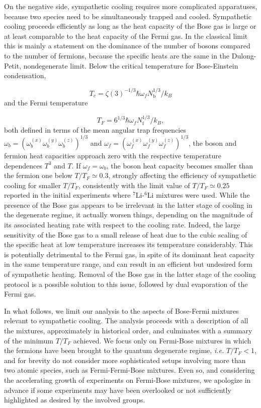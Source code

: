 \documentclass[pra,letterpaper,twocolumn,showpacs,superscriptaddress]{revtex4}
\begin{document}
On the negative side, sympathetic cooling requires more complicated apparatuses, because two species need to be simultaneously trapped and cooled. 
Sympathetic cooling proceeds efficiently as long as the heat capacity of the Bose gas is large or at least comparable to the heat capacity of the Fermi gas. 
In the classical limit this is mainly a statement on the dominance of the number of bosons compared to the number of fermions, because the specific heats 
are the same in the Dulong-Petit, nondegenerate limit. Below the critical temperature for Bose-Einstein condensation, 

$$T_c=\zeta(3)^{-1/3}\hbar \omega_f N_\mathrm{b}^{1/3}/k_B$$
and the Fermi temperature  

$$T_F=6^{1/3}\hbar \omega_f N_\mathrm{f}^{1/3}/k_B,$$
both defined in terms of the mean angular trap frequencies $\omega_b=(\omega_{b}^{(x)} \omega_{b}^{(y)} \omega_{b}^{(z)})^{1/3}$ and 
$\omega_f=(\omega_{f}^{(x)} \omega_{f}^{(y)} \omega_{f}^{(z)})^{1/3}$, the boson and fermion heat capacities approach zero with the respective 
temperature dependences $T^3$ and $T$. If $\omega_f=\omega_b$, the boson heat capacity becomes smaller than the fermion one below 
$T/T_F\simeq 0.3$, strongly affecting the  efficiency of sympathetic cooling for smaller $T/T_F$, consistently with the limit value 
of $T/T_F\simeq 0.25$ reported in the initial experiments \cite{Schreck2001a,Truscott2001,Schreck2001b} where $^7$Li-${}^{6}$Li mixtures were used. 
While the presence of the Bose gas appears to be irrelevant in the latter stage of cooling in the degenerate regime, it actually worsen things, depending 
on the magnitude of its associated heating rate with respect to the cooling rate. Indeed, the large sensitivity of the Bose gas to a small release of 
heat due to the cubic scaling of the specific heat at low temperature increases its temperature considerably. 
This is potentially detrimental to the Fermi gas, in spite of its dominant heat capacity in the same temperature range, and can result in an  
efficient but undesired form of sympathetic heating. Removal of the Bose gas in the latter stage of the cooling protocol is a possible solution 
to this issue, followed by dual evaporation of the Fermi gas. 

In what follows, we limit our analysis to the aspects of Bose-Fermi mixtures relevant to sympathetic cooling.  
The analysis proceeds with a description of all the mixtures, approximately in historical order, and culminates with 
a summary of the minimum $T/T_F$ achieved. We focus only on Fermi-Bose mixtures in which the fermions have been brought to the quantum 
degenerate regime, {\it i.e.} $T/T_F <1$, and for brevity do not consider more sophisticated setups involving more than two atomic species, such 
as Fermi-Fermi-Bose mixtures. Even so, and considering the accelerating growth of experiments on Fermi-Bose mixtures, we apologize in 
advance if some experiments may have been overlooked or not sufficiently highlighted as desired by the involved groups.
\end{document}

